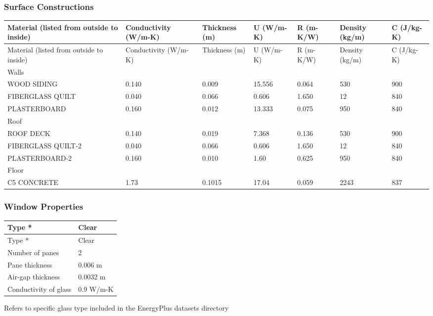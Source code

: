 \subsubsection{Surface Constructions}\label{surface-constructions}

{\scriptsize
\begin{longtable}[c]{>{\raggedright}p{0.85in}>{\raggedright}p{0.85in}>{\raggedright}p{0.85in}>{\raggedright}p{0.85in}>{\raggedright}p{0.85in}>{\raggedright}p{0.85in}>{\raggedright}p{0.85in}}
\toprule 
Material (listed from outside to inside) & Conductivity (W/m-K) & Thickness (m) & U (W/m-K) & R (m-K/W) & Density (kg/m) & C (J/kg-K) \tabularnewline
\midrule
\endfirsthead

\toprule 
Material (listed from outside to inside) & Conductivity (W/m-K) & Thickness (m) & U (W/m-K) & R (m-K/W) & Density (kg/m) & C (J/kg-K) \tabularnewline
\midrule
\endhead

Walls & ~ & ~ & ~ & ~ & ~ & ~ \tabularnewline
WOOD SIDING\--1 & 0.140 & 0.009 & 15.556 & 0.064 & 530 & 900 \tabularnewline
FIBERGLASS QUILT\--1 & 0.040 & 0.066 & 0.606 & 1.650 & 12 & 840 \tabularnewline
PLASTER\-BOARD\--1 & 0.160 & 0.012 & 13.333 & 0.075 & 950 & 840 \tabularnewline
Roof & ~ & ~ & ~ & ~ & ~ & ~ \tabularnewline
ROOF DECK & 0.140 & 0.019 & 7.368 & 0.136 & 530 & 900 \tabularnewline
FIBERGLASS QUILT-2 & 0.040 & 0.066 & 0.606 & 1.650 & 12 & 840 \tabularnewline
PLASTER\-BOARD-2 & 0.160 & 0.010 & 1.60 & 0.625 & 950 & 840 \tabularnewline
Floor & ~ & ~ & ~ & ~ & ~ & ~ \tabularnewline
C5 CONCRETE & 1.73 & 0.1015 & 17.04 & 0.059 & 2243 & 837 \tabularnewline
\bottomrule
\end{longtable}}

\subsubsection{Window Properties}\label{window-properties}

\begin{longtable}[c]{@{}ll@{}}
\toprule 
Type * & Clear \tabularnewline
\midrule
\endfirsthead

\toprule 
Type * & Clear \tabularnewline
\midrule
\endhead

Number of panes & 2 \tabularnewline
Pane thickness & 0.006 m \tabularnewline
Air-gap thickness & 0.0032 m \tabularnewline
Conductivity of glass & 0.9 W/m-K \tabularnewline
\bottomrule
\end{longtable}

Refers to specific glass type included in the EnergyPlus datasets directory

